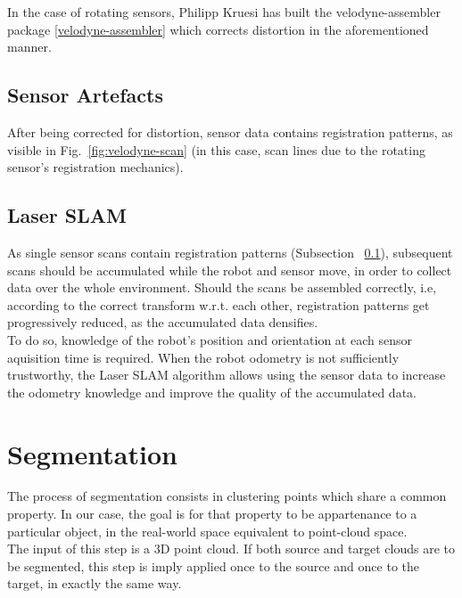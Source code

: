 In the case of rotating sensors, Philipp Kruesi has built the velodyne-assembler package \ref{velodyne-assembler} which corrects distortion in the aforementioned manner.\\ %

\subsection{Sensor Artefacts}
\label{subsec:artefacts}

After being corrected for distortion, sensor data contains registration patterns, as visible in Fig.~\ref{fig:velodyne-scan} (in this case, scan lines due to the rotating sensor's registration mechanics).

\subsection{Laser SLAM}
\label{subsec:SLAM}

As single sensor scans contain registration patterns (Subsection ~\ref{subsec:artefacts}), subsequent scans should be accumulated while the robot and sensor move, in order to collect data over the whole environment. Should the scans be assembled correctly, i.e, according to the correct transform w.r.t. each other, registration patterns get progressively reduced, as the accumulated data densifies.\\

To do so, knowledge of the robot's position and orientation at each sensor aquisition time is required. When the robot odometry is not sufficiently trustworthy, the Laser SLAM algorithm allows using the sensor data to increase the odometry knowledge and improve the quality of the accumulated data.\\

\section{Segmentation}
\label{sec:segmentation}

The process of segmentation consists in clustering points which share a common property. In our case, the goal is for that property to be appartenance to a particular object, in the real-world space equivalent to point-cloud space.\\

The input of this step is a 3D point cloud. If both source and target clouds are to be segmented, this step is imply applied once to the source and once to the target, in exactly the same way.

